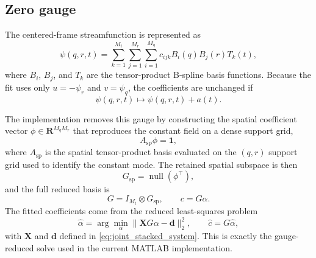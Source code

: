 \documentclass{article}
\begin{document}
\subsection{Zero gauge}

 The centered-frame streamfunction is represented as
 \[
 \psi(q,r,t) = \sum_{k=1}^{M_t} \sum_{j=1}^{M_r} \sum_{i=1}^{M_q}
 c_{ijk} B_i(q) B_j(r) T_k(t),
 \]
 where $B_i$, $B_j$, and $T_k$ are the tensor-product B-spline
 basis functions. Because the fit uses only $u = -\psi_r$ and
 $v = \psi_q$, the coefficients are unchanged if
 \[
 \psi(q,r,t) \mapsto \psi(q,r,t) + a(t).
 \]

 The implementation removes this gauge by constructing the spatial
 coefficient vector $\phi \in \mathbf{R}^{M_q M_r}$ that reproduces
 the constant field on a dense support grid,
\[
 A_{\mathrm{sp}} \phi = \mathbf{1},
 \]
 where $A_{\mathrm{sp}}$ is the spatial tensor-product basis evaluated
 on the $(q,r)$ support grid used to identify the constant mode.
 The retained spatial subspace is then
\[
 G_{\mathrm{sp}} = \operatorname{null}(\phi^\top),
 \]
 and the full reduced basis is
\[
 G = I_{M_t} \otimes G_{\mathrm{sp}},
 \qquad
 c = G \alpha.
 \]
 The fitted coefficients come from the reduced least-squares problem
\[
\hat{\alpha} = \arg\min_{\alpha} \|\mathbf{X} G \alpha - \mathbf{d}\|_2^2,
\qquad
\hat{c} = G \hat{\alpha},
\]
 with $\mathbf{X}$ and $\mathbf{d}$ defined in
\eqref{eq:joint_stacked_system}. This is exactly the gauge-reduced solve
 used in the current MATLAB implementation.
\end{document}
